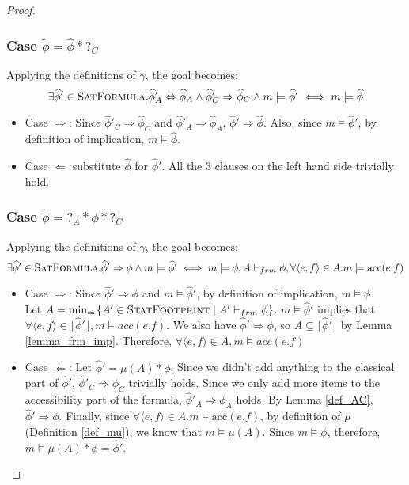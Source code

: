 \documentclass {article}
\newcommand{\fphi}{\widehat{\phi}}
\newcommand{\tphi}{\widetilde{\phi}}
\newcommand{\acc}[1]{\text{acc}(#1)}
\newcommand{\imp}{\Rightarrow}
\newcommand{\consistent}{\models}
\newcommand{\frm}{\vdash_{frm}}
\newcommand{\satdef}{\textsc{SatFormula}}
\newcommand{\statfprint}{\textsc{StatFootprint}}
\begin{document}
\begin{proof}
 \subsubsection*{Case $\tphi =  \fphi \ast ?_C$}
 Applying the definitions of $\gamma$, the goal becomes: $$\exists \fphi' \in 
\satdef. \fphi'_A \Leftrightarrow \fphi_A \wedge \fphi'_C \Rightarrow \fphi_C \wedge m \consistent  \fphi' \iff m \consistent \fphi$$
 \begin{itemize}
 	\item Case $\Rightarrow$: Since $\fphi'_C \Rightarrow \fphi_C$ and $\fphi'_A \Rightarrow \fphi_A$, $\fphi' \Rightarrow \fphi$. Also, since $m \consistent \fphi'$, by definition of implication, $m \consistent \fphi$.
 	\item Case $\Leftarrow$ substitute $\fphi$ for $\fphi'$.  All the 3 clauses on the left hand side trivially hold.
 \end{itemize} 
 
\subsubsection*{Case $\tphi = ?_A \ast \phi \ast ?_C$}
 Applying the definitions of $\gamma$, the goal becomes: $$\exists \fphi' \in 
\satdef. \fphi' \Rightarrow \phi \wedge m \consistent  \fphi' \iff m \consistent \phi, A \frm \phi,\forall \langle e,f\rangle  \in A. m \consistent \acc{e.f}$$
 \begin{itemize}
	\item Case $\Rightarrow$: Since $\fphi' \Rightarrow \phi$ and $m \consistent \fphi'$, by definition of implication, $m \consistent \phi$.\\ 
Let $A = \min_{\imp}\{A' \in \statfprint \mid A' \frm \phi\}$. $m \consistent \fphi'$ implies that $\forall \langle e,f\rangle  \in \lfloor \fphi' \rfloor, m \consistent acc(e.f)$. We also have $\fphi' \Rightarrow \phi$, so $A \subseteq \lfloor \fphi' \rfloor$ by Lemma \ref{lemma_frm_imp}. Therefore, $\forall \langle e,f\rangle  \in A, m \consistent acc(e.f)$
 	\item Case $\Leftarrow$: Let $\fphi' = \mu(A) \ast \phi$. Since we didn't add anything to the classical part of $\fphi'$, $\fphi'_C \imp \phi_C$ trivially holds. Since we only add more items to the accessibility part of the formula, $\fphi'_A \Rightarrow \phi_A$ holds. By Lemma \ref{def_AC}, $\fphi' \imp \phi$. Finally, since $\forall \langle e,f\rangle  \in A. m \consistent \acc{e.f}$, by definition of $\mu$ (Definition \ref{def_mu}), we know that $m \consistent \mu(A)$. Since $m \consistent \phi$, therefore, $m \consistent \mu(A) * \phi = \fphi'$.\\
 \end{itemize} 
 
 
 
\end{proof}
\end{document}
